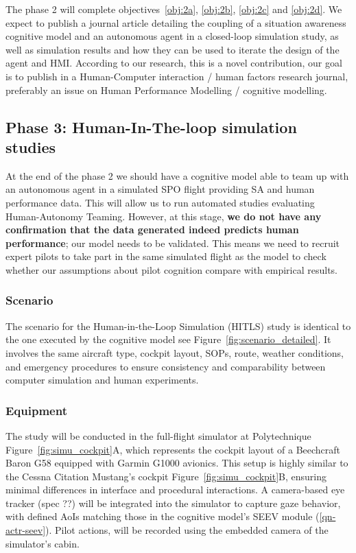 \documentclass[12pt,a4paper]{article} %
\begin{document}
	The phase 2 will complete objectives~\ref{obj:2a}, \ref{obj:2b}, \ref{obj:2c} and \ref{obj:2d}. We expect to publish a journal article detailing the coupling of a situation awareness cognitive model and an autonomous agent in a closed-loop simulation study, as well as simulation results and how they can be used to iterate the design of the agent and HMI. According to our research, this is a novel contribution, our goal is to publish in a Human-Computer interaction / human factors research journal, preferably an issue on Human Performance Modelling / cognitive modelling.

	\subsection{Phase 3: Human-In-The-loop simulation studies}
	At the end of the phase 2 we should have a cognitive model able to team up with an autonomous agent in a simulated SPO flight providing SA and human performance data. This will allow us to run automated studies evaluating Human-Autonomy Teaming. However, at this stage, \textbf{we do not have any confirmation that the data generated indeed predicts human performance}; our model needs to be validated. This means we need to recruit expert pilots to take part in the same simulated flight as the model to check whether our assumptions about pilot cognition compare with empirical results.

	\subsubsection{Scenario}
	The scenario for the Human-in-the-Loop Simulation (HITLS) study is identical to the one executed by the cognitive model see Figure~\ref{fig:scenario_detailed}. It involves the same aircraft type, cockpit layout, SOPs, route, weather conditions, and emergency procedures to ensure consistency and comparability between computer simulation and human experiments.

	\subsubsection{Equipment}
	The study will be conducted in the full-flight simulator at Polytechnique Figure~\ref{fig:simu_cockpit}A, which represents the cockpit layout of a Beechcraft Baron G58 equipped with Garmin G1000 avionics. This setup is highly similar to the Cessna Citation Mustang's cockpit Figure~\ref{fig:simu_cockpit}B, ensuring minimal differences in interface and procedural interactions. A camera-based eye tracker (spec ??) will be integrated into the simulator to capture gaze behavior, with defined AoIs matching those in the cognitive model's SEEV module (\ref{qn-actr-seev}). Pilot actions, will be recorded using the embedded camera of the simulator's cabin.
\end{document}

